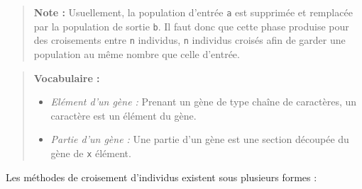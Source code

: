 \begin{quote}
\textbf{Note :} Usuellement, la population d'entrée \texttt{a} est
supprimée et remplacée par la population de sortie \texttt{b}. Il faut
donc que cette phase produise pour des croisements entre \texttt{n}
individus, \texttt{n} individus croisés afin de garder une population au
même nombre que celle d'entrée.
\end{quote}

\begin{quote}
\textbf{Vocabulaire :}

\begin{itemize}
\tightlist
\item
  \emph{Elément d'un gène :} Prenant un gène de type chaîne de
  caractères, un caractère est un élément du gène.
\item
  \emph{Partie d'un gène :} Une partie d'un gène est une section
  découpée du gène de \texttt{x} élément.
\end{itemize}
\end{quote}

Les méthodes de croisement d'individus existent sous plusieurs formes :

